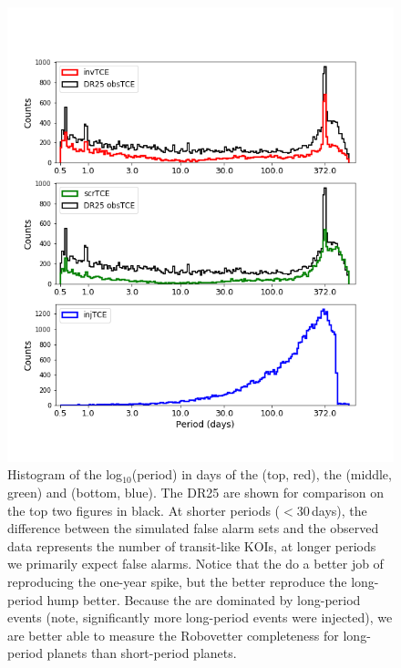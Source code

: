 \begin{figure}[ht]
 \begin{center}
  \includegraphics[width=0.88\linewidth]{fig-simulTcePeriods.png}
  \caption{Histogram of the log$_{10}$(period) in days of the  (top, red), the  (middle, green) and  (bottom, blue). The DR25  are shown for comparison on the top two figures in black.  At shorter periods ($< 30$\,days), the difference between the simulated false alarm sets and the observed data represents the number of transit-like KOIs, at longer periods we primarily expect false alarms.  Notice that the  do a better job of reproducing the one-year spike, but the  better reproduce the long-period hump better. Because the  are dominated by long-period events (note, significantly more long-period events were injected), we are better able to measure the Robovetter completeness for long-period planets than short-period planets.}
  \label{f:simtces} 
 \end{center}
 \end{figure}



